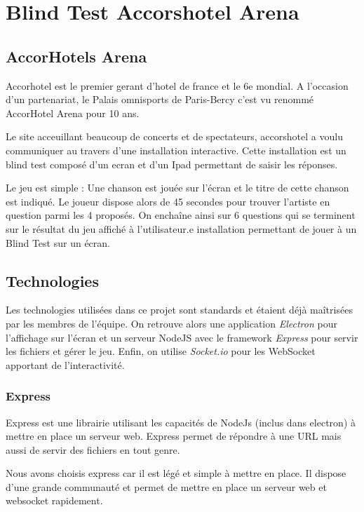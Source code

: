 \section{Blind Test Accorshotel Arena}

\subsection{AccorHotels Arena}

Accorhotel est le premier gerant d'hotel de france et le 6e mondial.
A l'occasion d'un partenariat, le Palais omnisports de Paris-Bercy c'est vu renommé AccorHotel Arena pour 10 ans.

Le site acceuillant beaucoup de concerts et de spectateurs, accorshotel a voulu communiquer au travers d'une installation interactive.
Cette installation est un blind test composé d'un ecran et d'un Ipad permettant de saisir les réponses.

Le jeu est simple : Une chanson est jouée sur l'écran et le titre de cette chanson est indiqué.
Le joueur dispose alors de 45 secondes pour trouver l'artiste en question parmi les 4 proposés.
On enchaîne ainsi sur 6 questions qui se terminent sur le résultat du jeu affiché à l'utilisateur.e installation permettant de jouer à un Blind Test sur un écran.

\subsection{Technologies}

Les technologies utilisées dans ce projet sont standards et étaient déjà maîtrisées par les membres de l'équipe.
On retrouve alors une application \emph{Electron} pour l'affichage sur l'écran et un serveur NodeJS avec le framework \emph{Express} pour servir les fichiers et gérer le jeu.
Enfin, on utilise \emph{Socket.io} pour les WebSocket apportant de l'interactivité.

\subsubsection{Express}

Express est une librairie utilisant les capacités de NodeJs (inclus dans electron) à mettre en place un serveur web.
Express permet de répondre à une URL mais aussi de servir des fichiers en tout genre.

Nous avons choisis express car il est légé et simple à mettre en place.
Il dispose d'une grande communauté et permet de mettre en place un serveur web et websocket rapidement.

